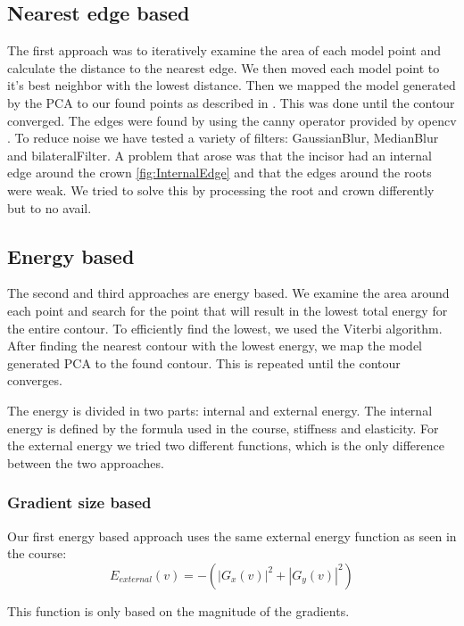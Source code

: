 \documentclass[a4paper,10pt]{article}
\begin{document}
\subsection{Nearest edge based}\label{sec:fit_edge}
The first approach was to iteratively examine the area of each model point and calculate the distance to the nearest edge. We then moved each model point to it's best neighbor with the lowest distance. Then we mapped the model generated by the PCA to our found points as described in \cite{GenerateModel}. This was done until the contour converged. The edges were found by using the canny operator provided by opencv \cite{Canny}. To reduce noise we have tested a variety of filters:  GaussianBlur, MedianBlur and bilateralFilter\cite{PythonFilters}. A problem that arose was that the incisor had an internal edge around the crown \ref{fig:InternalEdge} and that the edges around the roots were weak. We tried to solve this by processing the root and crown differently but to no avail.

\subsection{Energy based}\label{sec:fit_energy}
The second and third approaches are energy based. We examine the area around each point and search for the point that will result in the lowest total energy for the entire contour. To efficiently find the lowest, we used the Viterbi algorithm. After finding the nearest contour with the lowest energy, we map the model generated PCA to the found contour. This is repeated until the contour converges.

The energy is divided in two parts: internal and external energy. The internal energy is defined by the formula used in the course, stiffness and elasticity. For the external energy we tried two different functions, which is the only difference between the two approaches.

\subsubsection{Gradient size based}
Our first energy based approach uses the same external energy function as seen in the course:
\begin{equation}
E_{external}(v) = - ( |G_{x}(v)|^2 + |G_{y}(v)|^2 )
\end{equation}

This function is only based on the magnitude of the gradients.
\end{document}
